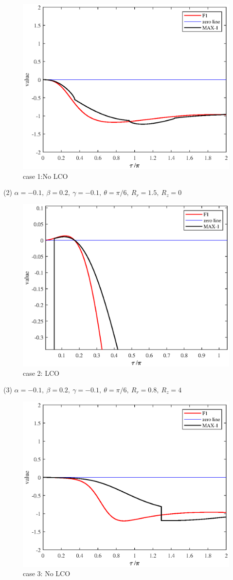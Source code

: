 \documentclass[a4paper,10pt]{article}
\begin{document}
\begin{figure}[h!]
	\centering
	\includegraphics[width=0.5 \linewidth]{BEB_Explanation/figures/class_case1.eps}
	\caption{case 1:No LCO}
	\label{fig: class case1}
\end{figure}

(2) $\alpha = -0.1,~\beta =0.2,~ \gamma = -0.1,~\theta = \pi/6,~R_r=1.5,~R_z=0$

\begin{figure}[h!]
	\centering
	\includegraphics[width=0.5 \linewidth]{BEB_Explanation/figures/class_case2.eps}
	\caption{case 2: LCO}
	\label{fig: class case2}
\end{figure}

(3) $\alpha = -0.1,~\beta =0.2,~ \gamma = -0.1,~\theta = \pi/6,~R_r=0.8,~R_z=4$

\begin{figure}[h!]
	\centering
	\includegraphics[width=0.5 \linewidth]{BEB_Explanation/figures/class_case3.eps}
	\caption{case 3: No LCO}
	\label{fig: class case3}
\end{figure}
\end{document}
